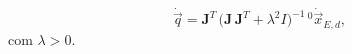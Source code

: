 \begin{equation}
\label{eq:pseudoinversa}
\dot{\vec q} =
\mathbf{J}^T\,\big(\mathbf{J}\,\mathbf{J}^T
+ \lambda^2 I\big)^{-1}\,{}^{0}\!\dot{\vec x}_{E,d},
\end{equation}
com $\lambda>0$.
